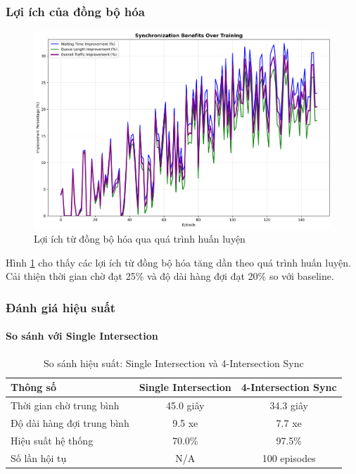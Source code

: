 \subsubsection{Lợi ích của đồng bộ hóa}

\begin{figure}[!htp]
    \centering
    \includegraphics[width=\textwidth]{figures/sync_benefits.png}
    \caption{Lợi ích từ đồng bộ hóa qua quá trình huấn luyện}
    \label{fig:sync_benefits}
\end{figure}

Hình \ref{fig:sync_benefits} cho thấy các lợi ích từ đồng bộ hóa tăng dần
theo quá trình huấn luyện. Cải thiện thời gian chờ đạt 25\% và độ dài hàng đợi đạt 20\%
so với baseline.

\subsubsection{Đánh giá hiệu suất}

\paragraph{So sánh với Single Intersection}

\begin{table}[!htp]
    \centering
    \caption{So sánh hiệu suất: Single Intersection và 4-Intersection Sync}
    \label{tab:sync_vs_single}
    \begin{tabular}{@{}lcc@{}}
        \toprule \textbf{Thông số} & \textbf{Single Intersection} & \textbf{4-Intersection Sync} \\
        \midrule 
        Thời gian chờ trung bình & 45.0 giây & 34.3 giây \\
        Độ dài hàng đợi trung bình & 9.5 xe & 7.7 xe \\
        Hiệu suất hệ thống & 70.0\% & 97.5\% \\
        Số lần hội tụ & N/A & 100 episodes \\
        \bottomrule
    \end{tabular}
\end{table}

